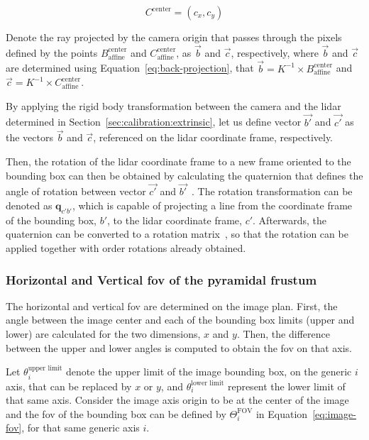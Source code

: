 \begin{equation}
\label{eq:image-pixel-center}
C^\text{center} = (c_x, c_y)
\end{equation}

Denote  the ray projected by the camera origin that passes through the pixels defined by the points $B^\text{center}_\text{affine}$ and $C^\text{center}_\text{affine}$, as $\vec{b}$ and $\vec{c}$, respectively, where $\vec{b}$ and $\vec{c}$ are determined using Equation~\eqref{eq:back-projection}, that $\vec{b} = K^{-1} \times B^\text{center}_\text{affine}$ and $\vec{c} = K^{-1} \times C^\text{center}_\text{affine}$.

By applying the rigid body transformation between the camera and the \ac{lidar} determined in Section~\ref{sec:calibration:extrinsic}, let us define vector $\vec{b'}$ and $\vec{c'}$ as the vectors $\vec{b}$ and $\vec{c}$, referenced on the \ac{lidar} coordinate frame, respectively.

Then, the rotation of the \ac{lidar} coordinate frame to a new frame oriented to the bounding box can then be obtained by calculating the quaternion that defines the angle of rotation between vector $\vec{c'}$ and $\vec{b'}$~\cite{mvg_book}. The rotation transformation can be denoted as $\mathbf{q}_{c'b'}$, which is capable of projecting a line from the coordinate frame of the bounding box, $b'$, to the \ac{lidar} coordinate frame, $c'$. Afterwards, the quaternion can be converted to a rotation matrix~\cite{Dai2015, mvg_book}, so that the rotation can be applied together with order rotations already obtained.

\subsubsection{Horizontal and Vertical \ac{fov} of the pyramidal frustum}
The horizontal and vertical \ac{fov} are determined on the image plan. First, the angle between the image center and each of the bounding box limits (upper and lower) are calculated for the two dimensions, $x$ and $y$. Then, the difference between the upper and lower angles is computed to obtain the \ac{fov} on that axis.

Let $\theta^\text{upper limit}_i$ denote the upper limit of the image bounding box, on the generic $i$ axis, that can be replaced by $x$ or $y$, and $\theta^\text{lower limit}_i$ represent the lower limit of that same axis. Consider the image axis origin to be at the center of the image and the \ac{fov} of the bounding box can be defined by $\Theta^\text{FOV}_i$ in Equation~\eqref{eq:image-fov}, for that same generic axis $i$.

